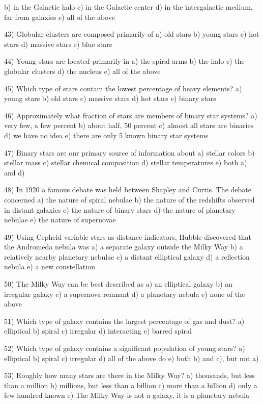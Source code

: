 
b) in the Galactic halo
c) in the Galactic center
d) in the intergalactic medium, far from galaxies
e) all of the above

43) Globular clusters are composed primarily of
a) old stars b) young stars c) hot stars d) massive stars e) blue stars

44) Young stars are located primarily in
a) the spiral arms b) the halo c) the globular clusters
d) the nucleus e) all of the above

45) Which type of stars contain the lowest percentage of heavy elements?
a) young stars b) old stars c) massive stars d) hot stars e) binary stars

46) Approximately what fraction of stars are members of binary star systems?
a) very few, a few percent b) about half, 50 percent
c) almost all stars are binaries d) we have no idea
e) there are only 5 known binary star systems

47) Binary stars are our primary source of information about
a) stellar colors b) stellar mass c) stellar chemical composition
d) stellar temperatures e) both a) and d)

48) In 1920 a famous debate was held between Shapley and Curtis.
The debate concerned
a) the nature of spiral nebulae
b) the nature of the redshifts observed in distant galaxies
c) the nature of binary stars
d) the nature of planetary nebulae
e) the nature of supernovae

49) Using Cepheid variable stars as distance indicators,
Hubble discovered that the Andromeda nebula was
a) a separate galaxy outside the Milky Way
b) a relatively nearby planetary nebulae
c) a distant elliptical galaxy
d) a reflection nebula
e) a new constellation

50) The Milky Way can be best described as
a) an elliptical galaxy b) an irregular galaxy c) a supernova remnant
d) a planetary nebula e) none of the above

51) Which type of galaxy contains the largest percentage of gas and dust?
a) elliptical b) spiral c) irregular d) interacting e) barred spiral

52) Which type of galaxy contains a significant population of young stars?
a) elliptical b) spiral c) irregular d) all of the above do
e) both b) and c), but not a)

53) Roughly how many stars are there in the Milky Way?
a) thousands, but less than a million
b) millions, but less than a billion
c) more than a billion
d) only a few hundred known
e) The Milky Way is not a galaxy, it is a planetary nebula

